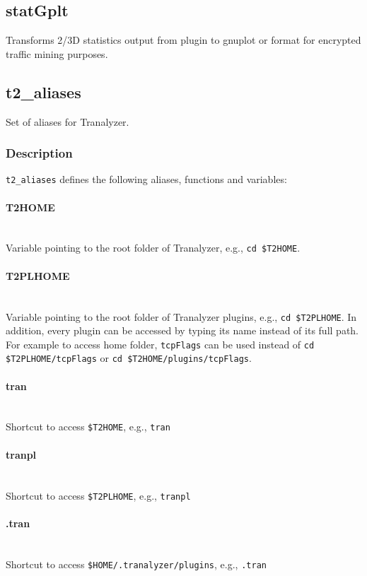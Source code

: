 \documentclass[documentation]{subfiles}
\begin{document}
\subsection{statGplt}
Transforms 2/3D statistics output from  plugin to gnuplot or  format for encrypted traffic mining purposes.

\subsection{t2\_aliases}\label{t2aliases}
Set of aliases for Tranalyzer.

\subsubsection{Description}
{\tt t2\_aliases} defines the following aliases, functions and variables:

\paragraph{T2HOME}~\\
Variable pointing to the root folder of Tranalyzer, e.g., {\tt cd \$T2HOME}.
\paragraph{T2PLHOME}~\\
Variable pointing to the root folder of Tranalyzer plugins, e.g., {\tt cd \$T2PLHOME}.
In addition, every plugin can be accessed by typing its name instead of its full path.
For example to access  home folder, {\tt tcpFlags} can be used instead of {\tt cd \$T2PLHOME/tcpFlags} or {\tt cd \$T2HOME/plugins/tcpFlags}.
\paragraph{tran}~\\
Shortcut to access {\tt\$T2HOME}, e.g., {\tt tran}
\paragraph{tranpl}~\\
Shortcut to access {\tt\$T2PLHOME}, e.g., {\tt tranpl}
\paragraph{.tran}~\\
Shortcut to access {\tt\$HOME/.tranalyzer/plugins}, e.g., {\tt .tran}
\end{document}
